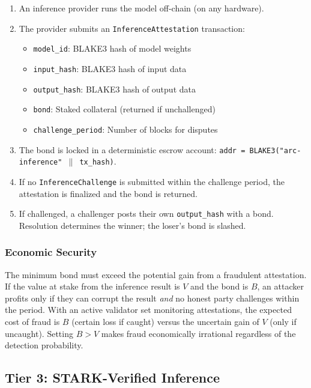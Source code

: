 \documentclass[conference]{IEEEtran}
\begin{document}
\begin{enumerate}
    \item An inference provider runs the model off-chain (on any hardware).
    \item The provider submits an \texttt{InferenceAttestation} transaction:
    \begin{itemize}
        \item \texttt{model\_id}: BLAKE3 hash of model weights
        \item \texttt{input\_hash}: BLAKE3 hash of input data
        \item \texttt{output\_hash}: BLAKE3 hash of output data
        \item \texttt{bond}: Staked collateral (returned if unchallenged)
        \item \texttt{challenge\_period}: Number of blocks for disputes
    \end{itemize}
    \item The bond is locked in a deterministic escrow account: \texttt{addr = BLAKE3("arc-inference" $\|$ tx\_hash)}.
    \item If no \texttt{InferenceChallenge} is submitted within the challenge period, the attestation is finalized and the bond is returned.
    \item If challenged, a challenger posts their own \texttt{output\_hash} with a bond. Resolution determines the winner; the loser's bond is slashed.
\end{enumerate}

\subsubsection{Economic Security}

The minimum bond must exceed the potential gain from a fraudulent attestation. If the value at stake from the inference result is $V$ and the bond is $B$, an attacker profits only if they can corrupt the result \emph{and} no honest party challenges within the period. With an active validator set monitoring attestations, the expected cost of fraud is $B$ (certain loss if caught) versus the uncertain gain of $V$ (only if uncaught). Setting $B > V$ makes fraud economically irrational regardless of the detection probability.

\subsection{Tier 3: STARK-Verified Inference}
\end{document}
